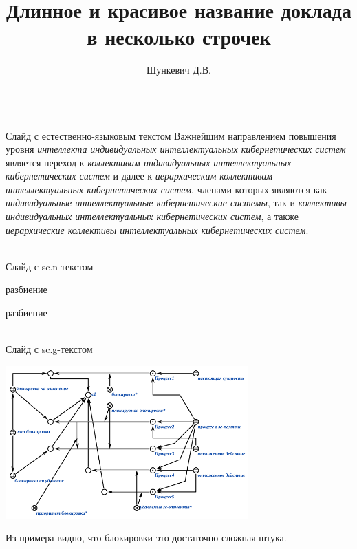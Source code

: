 \documentclass{beamer}
\title{Длинное и красивое название доклада в несколько строчек}
\author[]{Шункевич Д.В.}
\institute[]{Белорусский государственный университет информатики и радиоэлектроники}
\begin{document}
\begin{frame}
    \titlepage
\end{frame}

\begin{frame}{\\Слайд с естественно-языковым текстом}
    \topline
    \justifying
    Важнейшим направлением повышения уровня \textit{интеллекта} \textit{индивидуальных интеллектуальных кибернетических систем} является переход к \textit{коллективам индивидуальных интеллектуальных кибернетических систем} и далее к \textit{иерархическим коллективам интеллектуальных кибернетических систем}, членами которых являются как \textit{индивидуальные интеллектуальные кибернетические системы}, так и \textit{коллективы индивидуальных интеллектуальных кибернетических систем}, а также \textit{иерархические коллективы интеллектуальных кибернетических систем}.
\end{frame}

\begin{frame}{\\Слайд с sc.n-текстом}
\topline
\fontsize{10}{12}\selectfont
\begin{SCn}
\begin{scnrelfromset}{разбиение}
	\begin{scnindent}
		\begin{scnrelfromset}{разбиение}
		\end{scnrelfromset}
	\end{scnindent}
\end{scnrelfromset}
\end{SCn}
\end{frame}

\begin{frame}{\\Слайд с sc.g-текстом}
    \topline
    \begin{center}
        \includegraphics[width=0.7\textwidth]{figures/plan_lock_1.png}
    \end{center}
    Из примера видно, что блокировки это достаточно сложная штука.
\end{frame}
\end{document}
